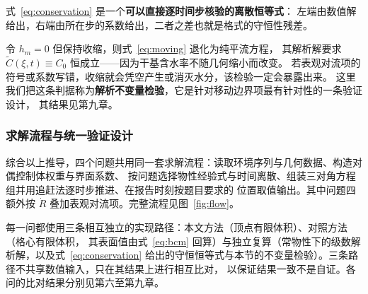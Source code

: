 
式~\eqref{eq:conservation} 是一个\textbf{可以直接逐时间步核验的离散恒等式}：
左端由数值解给出，右端由所在步的系数给出，二者之差也就是格式的守恒性残差。


令 $h_m=0$ 但保持收缩，则式~\eqref{eq:moving} 退化为纯平流方程，
其解析解要求 $\tilde C(\xi,t)\equiv C_0$ 恒成立——因为干基含水率不随几何缩小而改变。
若表观对流项的符号或系数写错，收缩就会凭空产生或消灭水分，该检验一定会暴露出来。
这里我们把这条判据称为\textbf{解析不变量检验}，它是针对移动边界项最有针对性的一条验证设计，
其结果见第九章。

\subsubsection{求解流程与统一验证设计}


综合以上推导，四个问题共用同一套求解流程：读取环境序列与几何数据、构造对偶控制体权重与界面系数、
按问题选择物性经验式与时间离散、组装三对角方程组并用追赶法逐时步推进、在报告时刻按题目要求的
位置取值输出。其中问题四额外按 $\dot R$ 叠加表观对流项。完整流程见图~\ref{fig:flow}。


每一问都使用三条相互独立的实现路径：本文方法（顶点有限体积）、对照方法（格心有限体积，
其表面值由式~\eqref{eq:bcm} 回算）与独立复算（常物性下的级数解析解，以及式~\eqref{eq:conservation}
给出的守恒恒等式与本节的不变量检验）。三条路径不共享数值输入，只在其结果上进行相互比对，
以保证结果一致不是自证。各问的比对结果分别见第六至第九章。
